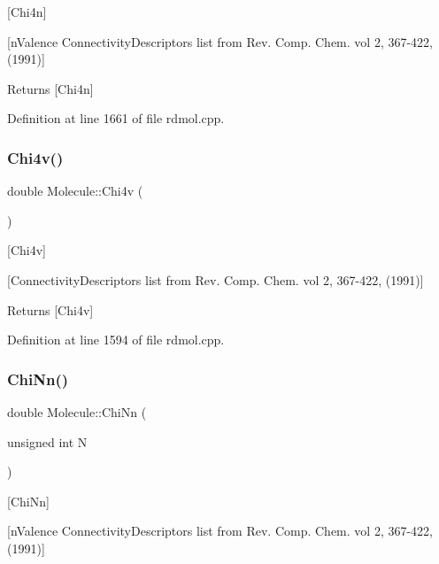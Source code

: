 \mbox{[}Chi4n\mbox{]} 

\mbox{[}n\+Valence Connectivity\+Descriptors list from Rev. Comp. Chem. vol 2, 367-\/422, (1991)\mbox{]}

\begin{DoxyReturn}{Returns}
\mbox{[}Chi4n\mbox{]} 
\end{DoxyReturn}


Definition at line 1661 of file rdmol.\+cpp.

\mbox{\label{class_molecule_a26ca2dbe4464eee3cf0405c1a09fb310}} 
\subsubsection{\texorpdfstring{Chi4v()}{Chi4v()}}
{\footnotesize\ttfamily double Molecule\+::\+Chi4v (\begin{DoxyParamCaption}{ }\end{DoxyParamCaption})}



\mbox{[}Chi4v\mbox{]} 

\mbox{[}Connectivity\+Descriptors list from Rev. Comp. Chem. vol 2, 367-\/422, (1991)\mbox{]}

\begin{DoxyReturn}{Returns}
\mbox{[}Chi4v\mbox{]} 
\end{DoxyReturn}


Definition at line 1594 of file rdmol.\+cpp.

\mbox{\label{class_molecule_a383c34ed1e85d4f07e1f70ee20eeb5ae}} 
\subsubsection{\texorpdfstring{Chi\+Nn()}{ChiNn()}}
{\footnotesize\ttfamily double Molecule\+::\+Chi\+Nn (\begin{DoxyParamCaption}\item[{unsigned int}]{N }\end{DoxyParamCaption})}



\mbox{[}Chi\+Nn\mbox{]} 

\mbox{[}n\+Valence Connectivity\+Descriptors list from Rev. Comp. Chem. vol 2, 367-\/422, (1991)\mbox{]}

